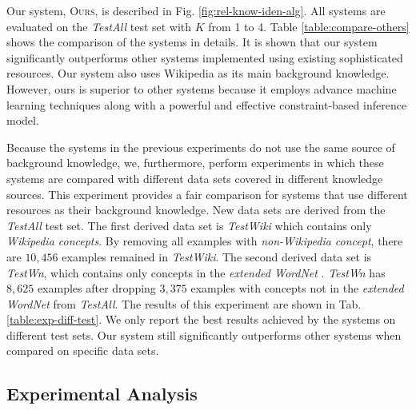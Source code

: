 Our system, \textsc{Ours}, is described in
Fig. \ref{fig:rel-know-iden-alg}. All systems are evaluated on the
{\em TestAll} test set with $K$ from 1 to 4. Table
\ref{table:compare-others} shows the comparison of the systems in
details. It is shown that our system significantly outperforms other
systems implemented using existing sophisticated resources. Our
system also uses Wikipedia as its main background
knowledge. However, ours is superior to other systems because it
employs advance machine learning techniques along with a powerful and
effective constraint-based inference model.

Because the systems in the previous experiments do not use the same
source of background knowledge, we, furthermore, perform experiments
in which these systems are compared with different data sets covered
in different knowledge sources. This experiment provides a fair
comparison for systems that use different resources as their
background knowledge. New data sets are derived from the {\em TestAll}
test set. The first derived data set is {\em TestWiki} which contains
only {\em Wikipedia concepts}. By removing all examples with {\em
  non-Wikipedia concept}, there are $10,456$ examples remained in {\em
  TestWiki}. The second derived data set is {\em TestWn}, which
contains only concepts in the {\em extended WordNet}
\cite{ilprints665,Snow2006}.  {\em TestWn} has $8,625$ examples after
dropping $3,375$ examples with concepts not in the {\em extended
  WordNet} from {\em TestAll}.  The results of this experiment are
shown in Tab. \ref{table:exp-diff-test}.  We only report the best
results achieved by the systems on different test sets. Our system
still significantly outperforms other systems when compared on
specific data sets.


\subsection{Experimental Analysis}

